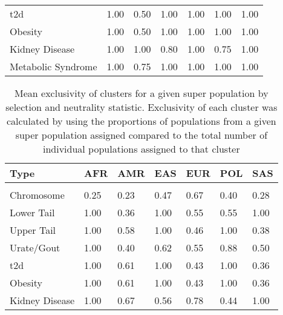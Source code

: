 \documentclass[]{report}
\begin{document}
\begin{table}
\begin{tabular}[t]{lllllll}
\hspace{1em}\Gls{t2d} & 1.00 & 0.50 & 1.00 & 1.00 & 1.00 & 1.00\\
\hspace{1em}Obesity & 1.00 & 0.50 & 1.00 & 1.00 & 1.00 & 1.00\\
\hspace{1em}Kidney Disease & 1.00 & 1.00 & 0.80 & 1.00 & 0.75 & 1.00\\
\hspace{1em}Metabolic Syndrome & 1.00 & 0.75 & 1.00 & 1.00 & 1.00 & 1.00\\
\bottomrule
\end{tabular}
\end{table}

\begin{table}

\caption[Mean exclusivity of clusters for a given super population by selection and neutrality statistic.]{\label{tab:exclusivity}\label{tab:exclusivity} Mean exclusivity of clusters for a given super population by selection and neutrality statistic. Exclusivity of each cluster was calculated by using the proportions of populations from a given super population assigned compared to the total number of individual populations assigned to that cluster}
\centering
\begin{tabular}[t]{lllllll}
\toprule
Type & AFR & AMR & EAS & EUR & POL & SAS\\
\midrule
\addlinespace[0.3em]
\multicolumn{7}{l}{\textbf{Fu and Li's F}}\\
\hspace{1em}Chromosome & 0.25 & 0.23 & 0.47 & 0.67 & 0.40 & 0.28\\
\hspace{1em}Lower Tail & 1.00 & 0.36 & 1.00 & 0.55 & 0.55 & 1.00\\
\hspace{1em}Upper Tail & 1.00 & 0.58 & 1.00 & 0.46 & 1.00 & 0.38\\
\hspace{1em}Urate/Gout & 1.00 & 0.40 & 0.62 & 0.55 & 0.88 & 0.50\\
\hspace{1em}\Gls{t2d} & 1.00 & 0.61 & 1.00 & 0.43 & 1.00 & 0.36\\
\hspace{1em}Obesity & 1.00 & 0.61 & 1.00 & 0.43 & 1.00 & 0.36\\
\hspace{1em}Kidney Disease & 1.00 & 0.67 & 0.56 & 0.78 & 0.44 & 1.00\\

\end{tabular}
\end{table}
\end{document}
